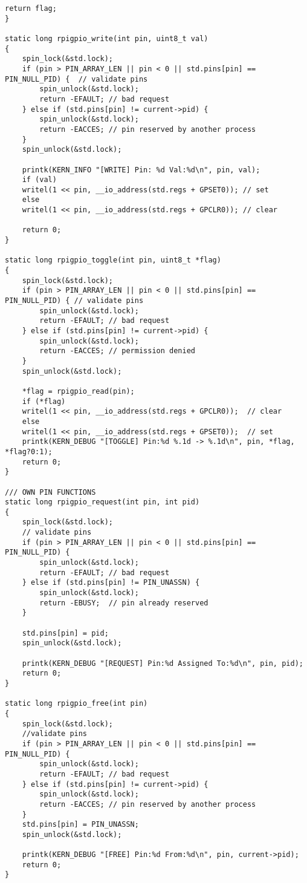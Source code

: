 \begin{lstlisting}[caption = {modgpio.c}, label=lst:modgpio.c]
	return flag;
}

static long rpigpio_write(int pin, uint8_t val) 
{
	spin_lock(&std.lock);
	if (pin > PIN_ARRAY_LEN || pin < 0 || std.pins[pin] == PIN_NULL_PID) {	// validate pins
		spin_unlock(&std.lock);
		return -EFAULT;	// bad request
	} else if (std.pins[pin] != current->pid) {
		spin_unlock(&std.lock);
		return -EACCES;	// pin reserved by another process
	}
	spin_unlock(&std.lock);
	
	printk(KERN_INFO "[WRITE] Pin: %d Val:%d\n", pin, val);
	if (val)
	writel(1 << pin, __io_address(std.regs + GPSET0)); // set
	else
	writel(1 << pin, __io_address(std.regs + GPCLR0)); // clear
	
	return 0;
}

static long rpigpio_toggle(int pin, uint8_t *flag)
{
	spin_lock(&std.lock);
	if (pin > PIN_ARRAY_LEN || pin < 0 || std.pins[pin] == PIN_NULL_PID) { // validate pins
		spin_unlock(&std.lock);
		return -EFAULT;	// bad request
	} else if (std.pins[pin] != current->pid) {
		spin_unlock(&std.lock);
		return -EACCES;	// permission denied
	}
	spin_unlock(&std.lock);
	
	*flag = rpigpio_read(pin);
	if (*flag)
	writel(1 << pin, __io_address(std.regs + GPCLR0));	// clear
	else
	writel(1 << pin, __io_address(std.regs + GPSET0));	// set
	printk(KERN_DEBUG "[TOGGLE] Pin:%d %.1d -> %.1d\n", pin, *flag, *flag?0:1);
	return 0;
}

/// OWN PIN FUNCTIONS
static long rpigpio_request(int pin, int pid) 
{
	spin_lock(&std.lock);
	// validate pins
	if (pin > PIN_ARRAY_LEN || pin < 0 || std.pins[pin] == PIN_NULL_PID) {
		spin_unlock(&std.lock);
		return -EFAULT;	// bad request
	} else if (std.pins[pin] != PIN_UNASSN) {
		spin_unlock(&std.lock);
		return -EBUSY;	// pin already reserved
	}
	
	std.pins[pin] = pid;
	spin_unlock(&std.lock);
	
	printk(KERN_DEBUG "[REQUEST] Pin:%d Assigned To:%d\n", pin, pid);
	return 0;
}

static long rpigpio_free(int pin) 
{
	spin_lock(&std.lock);
	//validate pins
	if (pin > PIN_ARRAY_LEN || pin < 0 || std.pins[pin] == PIN_NULL_PID) {
		spin_unlock(&std.lock);
		return -EFAULT;	// bad request
	} else if (std.pins[pin] != current->pid) {
		spin_unlock(&std.lock);
		return -EACCES;	// pin reserved by another process
	}
	std.pins[pin] = PIN_UNASSN;
	spin_unlock(&std.lock);
	
	printk(KERN_DEBUG "[FREE] Pin:%d From:%d\n", pin, current->pid);
	return 0;
}


\end{lstlisting}
